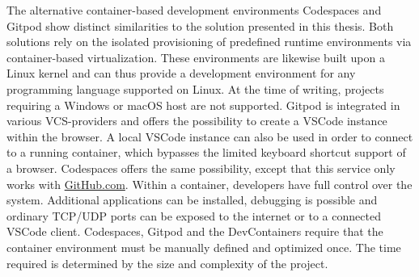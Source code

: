         The alternative container-based development environments Codespaces and Gitpod show distinct similarities to the solution presented in this thesis. Both solutions rely on the isolated provisioning of predefined runtime environments via container-based virtualization. These environments are likewise built upon a Linux kernel and can thus provide a development environment for any programming language supported on Linux. At the time of writing, projects requiring a Windows or macOS host are not supported.\newline
        Gitpod is integrated in various \ac{VCS}-providers and offers the possibility to create a \ac{VSCode} instance within the browser. A local \ac{VSCode} instance can also be used in order to connect to a running container, which bypasses the limited keyboard shortcut support of a browser. Codespaces offers the same possibility, except that this service only works with \href{https://www.GitHub.com}{GitHub.com}. Within a container, developers have full control over the system. Additional applications can be installed, debugging is possible and ordinary TCP/UDP ports can be exposed to the internet or to a connected \ac{VSCode} client. Codespaces, Gitpod and the DevContainers require that the container environment must be manually defined and optimized once. The time required is determined by the size and complexity of the project.\newline
